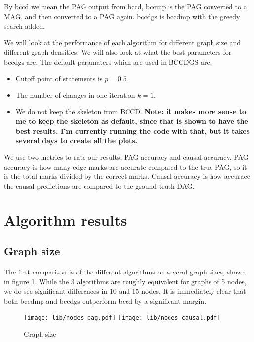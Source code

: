 \documentclass[11pt,a4paper]{report}
\theoremstyle{definition}
\begin{document}
By bccd we mean the PAG output from bccd, bccmp is the PAG converted to a
MAG, and then converted to a PAG again. bccdgs is bccdmp with the greedy
search added.

We will look at the performance of each algorithm for different graph
size and different graph densities. We will also look at what the best
parameters for bccdgs are. The default paramaters which are used in BCCDGS
are:

\begin{itemize}
  \item Cutoff point of statements is $p = 0.5$.

  \item The number of changes in one iteration $k = 1$.

  \item We do not keep the skeleton from BCCD.
    \textbf{Note: it makes more sense to me to keep the skeleton
    as default, since that is shown to have the best results.
    I'm currently running the code with that, but it takes several days to
    create all the plots.}

\end{itemize}

We use two metrics to rate our results, PAG accuracy and causal accuracy.
PAG accuracy is how many edge marks are accurate compared to the true PAG,
so it is the total marks divided by the correct marks. Causal accuracy is
how accurace the causal predictions are compared to the ground truth DAG.

\section{Algorithm results}

\subsection{Graph size}
The first comparison is of the different algorithms on several graph
sizes, shown in figure \ref{fig:nodes_causal}. While the 3 algorithms are
roughly equivalent for graphs of 5 nodes, we do see significant
differences in 10 and 15 nodes. It is immediately clear that both bccdmp
and bccdgs outperform bccd by a significant margin.
\begin{figure}
  \centering
  \texttt{[image: lib/nodes\_pag.pdf]}
  \texttt{[image: lib/nodes\_causal.pdf]}
  \caption{Graph size}
  \label{fig:nodes_causal}
\end{figure}
\end{document}
